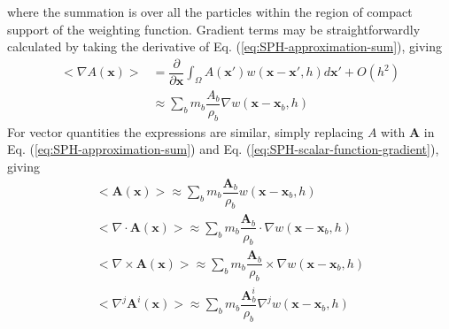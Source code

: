 \documentclass[journal abbreviation, manuscript]{copernicus}
\begin{document}
where the summation is over all the particles within the region of compact support of the weighting function. 
Gradient terms may be straightforwardly calculated by taking the derivative of Eq. (\ref{eq:SPH-approximation-sum}), giving
\begin{equation}
\begin{split}
<\nabla A\left(\textbf{x}\right)> & = \dfrac{\partial }{\partial \textbf{x}} \int_{\Omega} A\left(\textbf{x} \prime\right) w\left(\textbf{x}-\textbf{x}\prime, h\right) d\textbf{x}\prime + O\left(h^2\right) \\
& \approx \sum_b m_b \dfrac{A_b}{\rho_b} \nabla w\left(\textbf{x} - \textbf{x}_b, h\right)
\end{split} 
\label{eq:SPH-scalar-function-gradient}
\end{equation}
For vector quantities the expressions are similar, simply replacing $A$ with $\textbf{A}$ in Eq. (\ref{eq:SPH-approximation-sum}) and Eq. (\ref{eq:SPH-scalar-function-gradient}), giving
\begin{align}
<\textbf{A}\left(\textbf{x}\right)> \approx \sum_b m_b \dfrac{\textbf{A}_b}{\rho_b} w\left(\textbf{x}-\textbf{x}_b, h\right) \\
<\nabla \cdot \textbf{A}\left(\textbf{x}\right)> \approx \sum_b m_b \dfrac{\textbf{A}_b}{\rho_b} \cdot \nabla w\left(\textbf{x} - \textbf{x}_b, h\right) \\
<\nabla \times \textbf{A}\left(\textbf{x}\right)> \approx \sum_b m_b \dfrac{\textbf{A}_b}{\rho_b} \times \nabla w\left(\textbf{x} - \textbf{x}_b, h\right) \\
<\nabla^j \textbf{A}^i\left(\textbf{x}\right)> \approx \sum_b m_b \dfrac{\textbf{A}_b^i}{\rho_b} \nabla^j w\left(\textbf{x} - \textbf{x}_b, h\right) 
\label{eq:SPH-vecctor-function}
\end{align}
%
\end{document}
